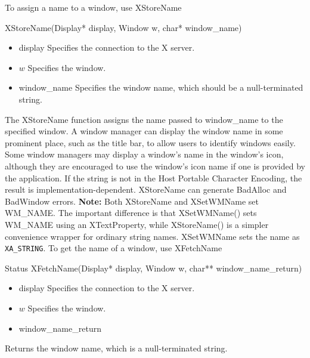 \documentclass{report}
\begin{document}
\begin{itemize}
\begin{itemize}
            \bigbreak \noindent 
            To assign a name to a window, use XStoreName
            \bigbreak \noindent 
            \begin{cppcode}
            XStoreName(Display* display, Window w, char* window_name)
            \end{cppcode}
            \bigbreak \noindent
            \begin{itemize}
                \item display Specifies the connection to the X server.
                \item $w$ Specifies the window.
                \item window\_name Specifies the window name, which should be a null-terminated string.
            \end{itemize}
            The XStoreName function assigns the name passed to window\_name to the specified window. A window manager can display the window name in some prominent place, such as the title bar, to allow users to identify windows easily. Some window managers may display a window’s name in the window’s icon, although they are encouraged to use the window’s icon name if one is provided by the application. If the string is not in the Host Portable Character Encoding, the result is implementation-dependent.
            \bigbreak \noindent 
            XStoreName can generate BadAlloc and BadWindow errors.
            \bigbreak \noindent 
            \textbf{Note:} Both XStoreName and XSetWMName set WM\_NAME. The important difference is that XSetWMName() sets WM\_NAME using an XTextProperty, while XStoreName() is a simpler convenience wrapper for ordinary string names. XSetWMName sets the name as \texttt{XA\_STRING}.
            \bigbreak \noindent 
            To get the name of a window, use XFetchName
            \bigbreak \noindent 
            \begin{cppcode}
            Status XFetchName(Display* display, Window w, char** window_name_return)
            \end{cppcode}
            \bigbreak \noindent
            \begin{itemize}
                \item display Specifies the connection to the X server.
                \item $w$ Specifies the window.
                \item window\_name\_return
            \end{itemize}
            Returns the window name, which is a null-terminated string.

\end{itemize}
\end{itemize}
\end{document}
